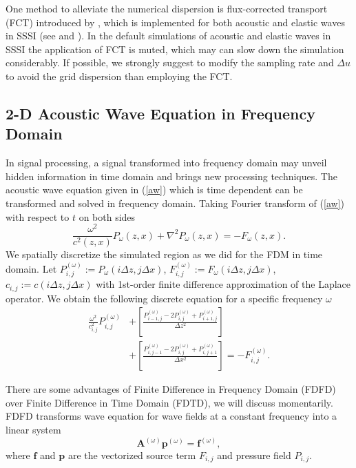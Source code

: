 \documentclass[11pt]{article}
\newcommand{\bA}{\boldsymbol{A}}
\newcommand{\bff}{\boldsymbol{f}}
\newcommand{\bp}{\boldsymbol{p}}
\theoremstyle{plain}
\theoremstyle{definition}
\theoremstyle{remark}
\numberwithin{equation}{section}
\begin{document}
One method to alleviate the numerical dispersion is flux-corrected transport (FCT) introduced by \cite{FeiLar1995}, 
which is implemented for both acoustic and elastic waves in SSSI (see  and ).
In the default simulations of acoustic and elastic waves in SSSI the application of FCT is muted, which may can slow down the 
simulation considerably. If possible, we strongly suggest to modify the sampling rate and $\Delta u$ 
to avoid the grid dispersion than employing the FCT.  


\subsection{2-D Acoustic Wave Equation in Frequency Domain}
In signal processing, a signal transformed into frequency domain may unveil hidden information in time domain and brings new processing
techniques. The acoustic wave equation given in (\ref{aw}) which is time dependent can be transformed and solved in frequency domain. 
Taking Fourier transform of (\ref{aw}) with respect to $t$ on both sides
  \begin{equation}
  \frac{\omega^2}{c^2(z, x)}P_{\omega}(z, x) + \nabla^2 P_{\omega}(z, x) =- F_{\omega}(z, x).
  \end{equation}
  We spatially discretize the simulated region as we did for the FDM in time domain.  
  Let $P_{i,j}^{(\omega)} := P_{\omega}(i\Delta z, j\Delta x)$, $F_{i,j}^{(\omega)} := 
  F_{\omega}(i\Delta z, j\Delta x)$, $c_{i,j} := c(i\Delta z, j\Delta x)$  with 1st-order finite difference approximation of the Laplace operator.
  We obtain the following discrete equation for a specific frequency $\omega$
  \begin{equation}
  \begin{aligned}
  \frac{\omega^2}{c_{i,j}^2} P_{i,j}^{(\omega)} &+\left[ \frac{P_{i-1,j}^{(\omega)} - 2P_{i,j}^{(\omega)} + P_{i+1,j}^{(\omega)}}{\Delta z^2} \right] \\&+\left[ \frac{P_{i,j-1}^{(\omega)} - 2P_{i,j}^{(\omega)} + P_{i,j+1}^{(\omega)}}{\Delta x^2} \right] =- F_{i,j}^{(\omega)}.
  \end{aligned}
  \end{equation}
  
There are some advantages of Finite Difference in Frequency Domain (FDFD) over Finite Difference in Time Domain (FDTD), we will discuss momentarily. FDFD transforms wave equation for wave fields at a constant frequency into a linear system 
\begin{equation}\label{awfreq}
\bA^{(\omega)}\bp^{(\omega)} = \bff^{(\omega)},
\end{equation}
where $\bff$ and $\bp$ are the vectorized source term $F_{i,j}$ and pressure field $P_{i,j}$.
\end{document}
